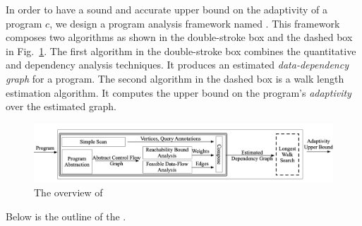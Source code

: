 In order to have a sound and accurate upper bound on the  adaptivity of a program $c$,
we design a program analysis framework named {\THESYSTEM}.
This framework composes two algorithms as shown in the double-stroke box and the dashed box in Fig.~\ref{fig:adaptfun}.
The first algorithm in the double-stroke box combines the quantitative and dependency analysis techniques.
It produces an estimated \emph{data-dependency graph} for a program.
The second algorithm in the dashed box is a walk length estimation algorithm.
It computes the upper bound on the program's \emph{adaptivity} over the estimated graph.
\begin{figure}
  \centering    
\includegraphics[width=1.0\columnwidth]{adaptfun.png}
  \vspace{-0.3cm}
  \caption{The overview of {\THESYSTEM}}
  \label{fig:adaptfun}
  \vspace{-0.5cm}
\end{figure}
%
Below is the outline of the {\THESYSTEM}.
